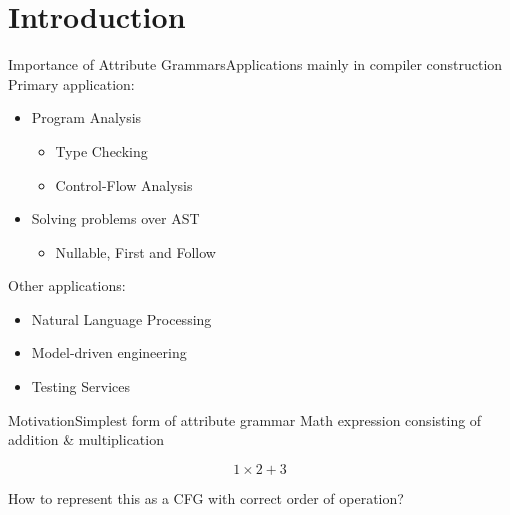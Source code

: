 \section{Introduction}

\begin{frame}{Importance of Attribute Grammars}{Applications mainly in compiler construction}
Primary application:

\begin{itemize}
    \item Program Analysis
        \begin{itemize}
            \item  Type Checking
            \item Control-Flow Analysis
        \end{itemize}
    \item Solving problems over AST
        \begin{itemize}
            \item  Nullable, First and Follow
        \end{itemize}
\end{itemize}

\emptyline

Other applications:
\begin{itemize}
    \item Natural Language Processing \cite{10.1007/978-3-642-25324-9_25}
    \item Model-driven engineering \cite{schone2020connecting}
    \item Testing Services \cite{habibisharif}
\end{itemize}
\end{frame}



\begin{frame}{Motivation}{Simplest form of attribute grammar}
Math expression consisting of addition \& multiplication

\[ 1 \times 2 + 3  \]

\newlinevspace

How to represent this as a \alert{CFG} with correct order of operation?
\end{frame}


